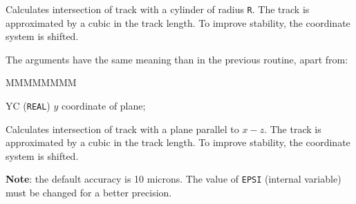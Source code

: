 Calculates intersection of track with a cylinder
of radius {\tt R}. The track is approximated by a cubic
in the track length. To improve stability, the coordinate system
is shifted.

The arguments have the same meaning than in the previous routine, apart from:
\begin{DLtt}{MMMMMMMM}
\item[YC] ({\tt REAL}) $y$ coordinate of plane;
\end{DLtt}
Calculates intersection of track with a plane parallel to $x-z$.
The track is approximated by a cubic
in the track length. To improve stability, the coordinate system
is shifted.

{\bf Note}: the default accuracy is 10 microns. The value
of {\tt EPSI} (internal variable) must be changed for a better precision.
